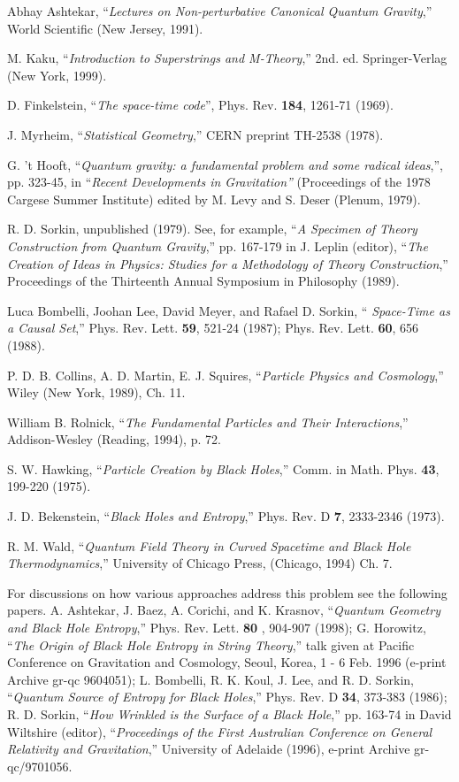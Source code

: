 \documentclass[aps,amssymb,12pt]{revtex4-2}
\begin{document}
\begin{references}
  Abhay Ashtekar, ``{\it Lectures on Non-perturbative Canonical
Quantum Gravity},'' World Scientific (New Jersey, 1991).

  M. Kaku, ``{\it Introduction to Superstrings and M-Theory},''
2nd. ed. Springer-Verlag (New York, 1999).

  D. Finkelstein, ``{\it The space-time code}'', Phys. Rev. {\bf %
184}, 1261-71 (1969).

  J. Myrheim, ``{\it Statistical Geometry},'' CERN preprint
TH-2538 (1978).

  G. 't Hooft, ``{\it Quantum gravity: a fundamental problem and
some radical ideas},'', pp. 323-45, in ``{\it Recent Developments in
Gravitation''} (Proceedings of the 1978 Cargese Summer Institute) edited by
M. Levy and S. Deser (Plenum, 1979).

  R. D. Sorkin, unpublished (1979). See, for example, ``{\it A
Specimen of Theory Construction from Quantum Gravity},'' pp. 167-179 in J.
Leplin (editor), ``{\it The Creation of Ideas in Physics: Studies for a
Methodology of Theory Construction},'' Proceedings of the Thirteenth Annual
Symposium in Philosophy (1989).

  Luca Bombelli, Joohan Lee, David Meyer, and Rafael D. Sorkin, ``%
{\it Space-Time as a Causal Set},'' Phys. Rev. Lett. {\bf 59}, 521-24
(1987); Phys. Rev. Lett. {\bf 60}, 656 (1988).

  P. D. B. Collins, A. D. Martin, E. J. Squires, ``{\it Particle
Physics and Cosmology},'' Wiley (New York, 1989), Ch. 11.

  William B. Rolnick, ``{\it The Fundamental Particles and Their
Interactions},'' Addison-Wesley (Reading, 1994), p. 72.

  S. W. Hawking, ``{\it Particle Creation by Black Holes},''
Comm. in Math. Phys. {\bf 43}, 199-220 (1975).

  J. D. Bekenstein, ``{\it Black Holes and Entropy},'' Phys.
Rev. D {\bf 7}, 2333-2346 (1973).

  R. M. Wald, ``{\it Quantum Field Theory in Curved Spacetime
and Black Hole Thermodynamics},'' University of Chicago Press, (Chicago,
1994) Ch. 7.

  For discussions on how various approaches address this problem
see the following papers. A. Ashtekar, J. Baez, A. Corichi, and K. Krasnov,
``{\it Quantum Geometry and Black Hole Entropy},'' Phys. Rev. Lett. {\bf 80}%
, 904-907 (1998); G. Horowitz, ``{\it The Origin of Black Hole Entropy in
String Theory},'' talk given at Pacific Conference on Gravitation and
Cosmology, Seoul, Korea, 1 - 6 Feb. 1996 (e-print Archive gr-qc 9604051); L.
Bombelli, R. K. Koul, J. Lee, and R. D. Sorkin, ``{\it Quantum Source of
Entropy for Black Holes},'' Phys. Rev. D {\bf 34}, 373-383 (1986); R. D.
Sorkin, ``{\it How Wrinkled is the Surface of a Black Hole},'' pp. 163-74 in
David Wiltshire (editor), ``{\it Proceedings of the First Australian
Conference on General Relativity and Gravitation},'' University of Adelaide
(1996), e-print Archive gr-qc/9701056.


\end{references}
\end{document}
